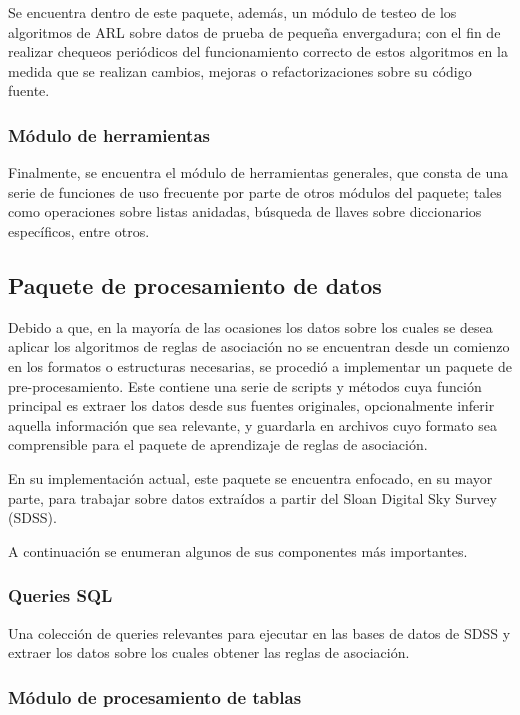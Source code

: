Se encuentra dentro de este paquete, además, un módulo de testeo de los algoritmos de ARL sobre datos de prueba de pequeña envergadura; con el fin de realizar chequeos periódicos del funcionamiento correcto de estos algoritmos en la medida que se realizan cambios, mejoras o refactorizaciones sobre su código fuente.

\subsubsection{Módulo de herramientas}

Finalmente, se encuentra el módulo de herramientas generales, que consta de una serie de funciones de uso frecuente por parte de otros módulos del paquete; tales como operaciones sobre listas anidadas, búsqueda de llaves sobre diccionarios específicos, entre otros.

\subsection{Paquete de procesamiento de datos}

Debido a que, en la mayoría de las ocasiones los datos sobre los cuales se desea aplicar los algoritmos de reglas de asociación no se encuentran desde un comienzo en los formatos o estructuras necesarias, se procedió a implementar un paquete de pre-procesamiento. Este contiene una serie de scripts y métodos cuya función principal es extraer los datos desde sus fuentes originales, opcionalmente inferir aquella información que sea relevante, y guardarla en archivos cuyo formato sea comprensible para el paquete de aprendizaje de reglas de asociación.

En su implementación actual, este paquete se encuentra enfocado, en su mayor parte, para trabajar sobre datos extraídos a partir del Sloan Digital Sky Survey (SDSS).

A continuación se enumeran algunos de sus componentes más importantes.

\subsubsection{Queries SQL}

Una colección de queries relevantes para ejecutar en las bases de datos de SDSS y extraer los datos sobre los cuales obtener las reglas de asociación.

\subsubsection{Módulo de procesamiento de tablas}

